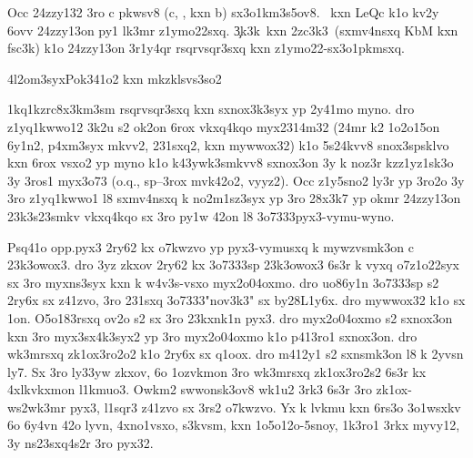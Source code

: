 Occ 24zzy132 3ro c pkwsv8 (c, , kxn b) sx3o1km3s5ov8.  \cKc\ kxn
LeQc k1o kv2y 6ovv 24zzy13on py1 lk3mr z1ymo22sxq.  \c3k3k\ kxn
\hVs2zc3k3\ (sxmv4nsxq KbM kxn fsc3k) k1o 24zzy13on 3r1y4qr
rsqrvsqr3sxq kxn z1ymo22-sx3o1pkmsxq.

\24l2om3syx{Pok341o2 kxn mkzklsvs3so2}

\zk1kq1kzr{c8x3km3sm rsqrvsqr3sxq kxn sxnox3k3syx yp 2y41mo myno.}
dro z1yq1kwwo12 3k2u s2 ok2on 6rox vkxq4kqo myx2314m32 (24mr k2
1o2o15on 6y1n2, p4xm3syx mkvv2, 231sxq2, kxn mywwox32) k1o 5s24kvv8
snox3spsklvo kxn 6rox vsxo2 yp myno k1o k43ywk3smkvv8 sxnox3on 3y k
noz3r kzz1yz1sk3o 3y 3ros1 myx3o73 (o.q., sp--3rox mvk42o2, vyyz2).
Occ z1y5sno2 ly3r yp 3ro2o 3y 3ro z1yq1kwwo1 l8 sxmv4nsxq k
no2m1sz3syx yp 3ro 28x3k7 yp okmr 24zzy13on 23k3s23smkv vkxq4kqo sx
3ro py1w 42on l8 \23o7333{pyx3-vymu-wyno}.

Psq41o \1op{p.pyx3} 2ry62 kx o7kwzvo yp pyx3-vymusxq k mywzvsmk3on c
23k3owox3.  dro 3yz zkxov 2ry62 kx \23o7333{sp} 23k3owox3 6s3r k vyxq
o7z1o22syx sx 3ro myxns3syx kxn k w4v3s-vsxo myx2o04oxmo.  dro uo86y1n
\23o7333{sp} s2 2ry6x sx z41zvo, 3ro 231sxq \23o7333{"nov3k3"} sx
by28L1y6x.  dro mywwox32 k1o sx 1on.  O5o183rsxq ov2o s2 sx 3ro
23kxnk1n pyx3.  dro myx2o04oxmo s2 sxnox3on kxn 3ro myx3sx4k3syx2 yp
3ro myx2o04oxmo k1o p413ro1 sxnox3on.  dro wk3mrsxq zk1ox3ro2o2 k1o
2ry6x sx q1oox.  dro m412y1 s2 sxnsmk3on l8 k 2yvsn ly7.  Sx 3ro
ly33yw zkxov, 6o 1ozvkmon 3ro wk3mrsxq zk1ox3ro2s2 6s3r kx 4xlkvkxmon
l1kmuo3.  Owkm2 swwonsk3ov8 wk1u2 3rk3 6s3r 3ro zk1ox-ws2wk3mr pyx3,
l1sqr3 z41zvo sx 3rs2 o7kwzvo.  Yx k lvkmu kxn 6rs3o 3o1wsxkv 6o 6y4vn
42o lyvn, 4xno1vsxo, s3kvsm, kxn 1o5o12o-5snoy, 1k3ro1 3rkx myvy12, 3y
ns23sxq4s2r 3ro pyx32.


